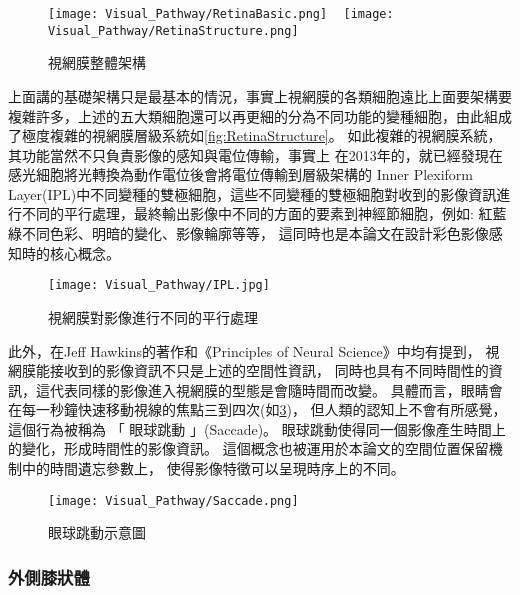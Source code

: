 \documentclass[class=NCU_thesis, crop=false]{standalone}
\begin{document}
\begin{figure}[H]
  \centering
    {\texttt{[image: Visual\_Pathway/RetinaBasic.png]}
    }
~
    {\texttt{[image: Visual\_Pathway/RetinaStructure.png]}
    }
  \caption{視網膜整體架構}
  \label{fig:RetinaTotalStructure}
\end{figure}

上面講的基礎架構只是最基本的情況，事實上視網膜的各類細胞遠比上面要架構要複雜許多，上述的五大類細胞還可以再更細的分為不同功能的變種細胞，由此組成了極度複雜的視網膜層級系統如\cref{fig:RetinaStructure}。
如此複雜的視網膜系統，其功能當然不只負責影像的感知與電位傳輸，事實上
在2013年的\cite{annurev}，就已經發現在感光細胞將光轉換為動作電位後會將電位傳輸到層級架構的 Inner Plexiform Layer(IPL)中不同變種的雙極細胞，這些不同變種的雙極細胞對收到的影像資訊進行不同的平行處理，最終輸出影像中不同的方面的要素到神經節細胞，例如: 紅藍綠不同色彩、明暗的變化、影像輪廓等等， 這同時也是本論文在設計彩色影像感知時的核心概念。

\begin{figure}[H]
  \centering
  \texttt{[image: Visual\_Pathway/IPL.jpg]}
  \caption{視網膜對影像進行不同的平行處理~\cite{annurev}}
  \label{fig:IPL}
\end{figure}


此外，在Jeff Hawkins的著作\cite{10.5555/993636}和《Principles of Neural Science》\cite{1180370208}中均有提到，
視網膜能接收到的影像資訊不只是上述的空間性資訊，
同時也具有不同時間性的資訊，這代表同樣的影像進入視網膜的型態是會隨時間而改變。
具體而言，眼睛會在每一秒鐘快速移動視線的焦點三到四次(如\cref{fig:Saccade})，
但人類的認知上不會有所感覺，這個行為被稱為 「 眼球跳動 」(Saccade)。
眼球跳動使得同一個影像產生時間上的變化，形成時間性的影像資訊。
這個概念也被運用於本論文的空間位置保留機制中的時間遺忘參數上，
使得影像特徵可以呈現時序上的不同。

\begin{figure}[H]
  \centering
  \texttt{[image: Visual\_Pathway/Saccade.png]}
  \caption{眼球跳動示意圖~\cite{annurev}}
  \label{fig:Saccade}
\end{figure}

\subsubsection{外側膝狀體}
\end{document}
